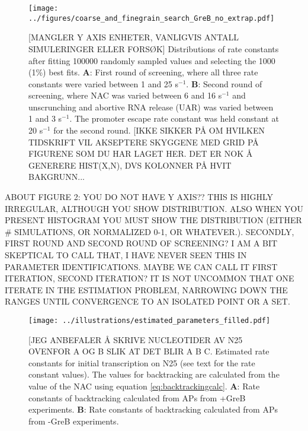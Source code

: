 \begin{figure}
	\begin{center}
      \texttt{[image: ../figures/coarse\_and\_finegrain\_search\_GreB\_no\_extrap.pdf]}
	\end{center}
    \caption{[MANGLER Y AXIS ENHETER, VANLIGVIS ANTALL SIMULERINGER ELLER FORSØK] Distributions of rate constants after fitting 100000 randomly
      sampled values and selecting the 1000 (1\%) best fits. \textbf{A}: First round
      of screening, where all three rate constants were varied between 1 and
      25 s$^{-1}$. \textbf{B}: Second round of screening, where NAC was varied
      between 6 and 16 s$^{-1}$ and unscrunching and abortive RNA release
      (UAR) was varied between 1 and 3 s$^{-1}$. The promoter escape rate
      constant was held constant at 20 s$^{-1}$ for the second round. [IKKE SIKKER PÅ OM HVILKEN TIDSKRIFT VIL AKSEPTERE SKYGGENE MED GRID PÅ FIGURENE SOM DU HAR LAGET HER. DET ER NOK Å GENERERE HIST(X,N), DVS KOLONNER PÅ HVIT BAKGRUNN...}
      \label{fig:parameter_estimation_proper}
\end{figure}
ABOUT FIGURE 2: YOU DO NOT HAVE Y AXIS?? THIS IS HIGHLY IRREGULAR, ALTHOUGH YOU SHOW DISTRIBUTION. ALSO WHEN YOU PRESENT HISTOGRAM YOU MUST SHOW THE DISTRIBUTION (EITHER # SIMULATIONS, OR NORMALIZED 0-1, OR WHATEVER.). SECONDLY, FIRST ROUND AND SECOND ROUND OF SCREENING? I AM A BIT SKEPTICAL TO CALL THAT, I HAVE NEVER SEEN THIS IN PARAMETER IDENTIFICATIONS. MAYBE WE CAN CALL IT FIRST ITERATION, SECOND ITERATION? IT IS NOT UNCOMMON THAT ONE ITERATE IN THE ESTIMATION PROBLEM, NARROWING DOWN THE RANGES UNTIL CONVERGENCE TO AN ISOLATED POINT OR A SET. 

\begin{figure}
	\begin{center}
      \texttt{[image: ../illustrations/estimated\_parameters\_filled.pdf]}
	\end{center}
    \caption{[JEG ANBEFALER Å SKRIVE NUCLEOTIDER AV N25 OVENFOR A OG B SLIK AT DET BLIR A B C. Estimated rate constants for initial transcription on N25 (see text for the rate constant values). The values for backtracking are calculated
      from the value of the NAC using equation \eqref{eq:backtrackingcalc}.
      \textbf{A}: Rate constants of backtracking calculated from APs 
      from +GreB experiments. \textbf{B}: Rate constants of
      backtracking calculated from APs from -GreB experiments.}
    \label{fig:estimated_parameters}
\end{figure}

